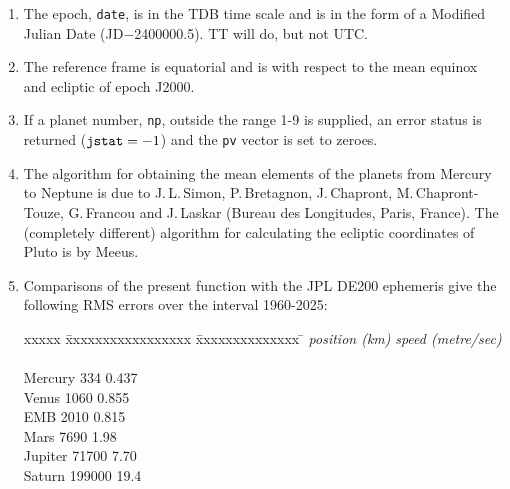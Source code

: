 \documentclass[11pt,fleqn,twoside]{article}
\renewcommand{\_}{{\tt\char'137}}     %
\begin{document}
{
 \begin{enumerate}
  \item The epoch, {\tt date},
        is in the TDB time scale and is in the form
        of a Modified Julian Date (JD$-$2400000.5).  TT will do,
        but not UTC.
  \item The reference frame is equatorial and is with respect to
        the mean equinox and ecliptic of epoch J2000.
  \item If a planet number, {\tt np},
        outside the range 1-9 is supplied, an error
        status is returned (${\tt jstat}=-1$)
        and the {\tt pv} vector is set to zeroes.
  \item The algorithm for obtaining the mean elements of the
        planets from Mercury to Neptune is due to
        J.\,L.\,Simon, P.\,Bretagnon, J.\,Chapront,
        M.\,Chapront-Touze, G.\,Francou and J.\,Laskar (Bureau des
        Longitudes, Paris, France).  The (completely different)
        algorithm for calculating the ecliptic coordinates of
        Pluto is by Meeus.
  \item Comparisons of the present function with the JPL DE200 ephemeris
        give the following RMS errors over the interval 1960-2025:
        \begin{tabbing}
         xxxxx \= xxxxxxxxxxxxxxxxx \= xxxxxxxxxxxxxx \= \kill
         \> \> {\it position (km)} \> {\it speed (metre/sec)} \\ \\
         \> Mercury \> \hspace{2em}334 \> \hspace{2.5em}0.437 \\
         \> Venus   \> \hspace{1.5em}1060 \> \hspace{2.5em}0.855 \\
         \> EMB     \> \hspace{1.5em}2010 \> \hspace{2.5em}0.815 \\
         \> Mars    \> \hspace{1.5em}7690 \> \hspace{2.5em}1.98 \\
         \> Jupiter \> \hspace{1em}71700 \> \hspace{2.5em}7.70 \\
         \> Saturn  \> \hspace{0.5em}199000 \> \hspace{2em}19.4 \\

\end{tabbing}
\end{enumerate}}
\end{document}
